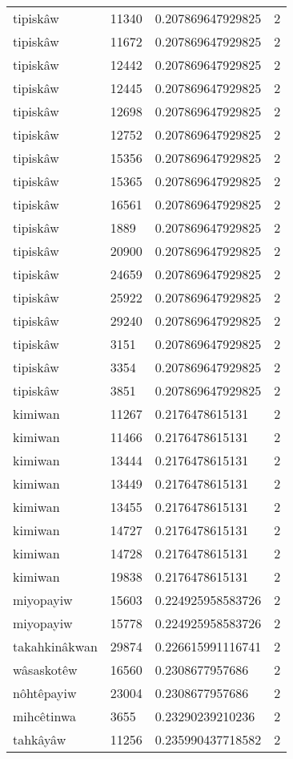 \begin{longtable}{llll}
tipiskâw & 11340 & 0.207869647929825 & 2 \\
tipiskâw & 11672 & 0.207869647929825 & 2 \\
tipiskâw & 12442 & 0.207869647929825 & 2 \\
tipiskâw & 12445 & 0.207869647929825 & 2 \\
tipiskâw & 12698 & 0.207869647929825 & 2 \\
tipiskâw & 12752 & 0.207869647929825 & 2 \\
tipiskâw & 15356 & 0.207869647929825 & 2 \\
tipiskâw & 15365 & 0.207869647929825 & 2 \\
tipiskâw & 16561 & 0.207869647929825 & 2 \\
tipiskâw & 1889 & 0.207869647929825 & 2 \\
tipiskâw & 20900 & 0.207869647929825 & 2 \\
tipiskâw & 24659 & 0.207869647929825 & 2 \\
tipiskâw & 25922 & 0.207869647929825 & 2 \\
tipiskâw & 29240 & 0.207869647929825 & 2 \\
tipiskâw & 3151 & 0.207869647929825 & 2 \\
tipiskâw & 3354 & 0.207869647929825 & 2 \\
tipiskâw & 3851 & 0.207869647929825 & 2 \\
kimiwan & 11267 & 0.2176478615131 & 2 \\
kimiwan & 11466 & 0.2176478615131 & 2 \\
kimiwan & 13444 & 0.2176478615131 & 2 \\
kimiwan & 13449 & 0.2176478615131 & 2 \\
kimiwan & 13455 & 0.2176478615131 & 2 \\
kimiwan & 14727 & 0.2176478615131 & 2 \\
kimiwan & 14728 & 0.2176478615131 & 2 \\
kimiwan & 19838 & 0.2176478615131 & 2 \\
miyopayiw & 15603 & 0.224925958583726 & 2 \\
miyopayiw & 15778 & 0.224925958583726 & 2 \\
takahkinâkwan & 29874 & 0.226615991116741 & 2 \\
wâsaskotêw & 16560 & 0.2308677957686 & 2 \\
nôhtêpayiw & 23004 & 0.2308677957686 & 2 \\
mihcêtinwa & 3655 & 0.23290239210236 & 2 \\
tahkâyâw & 11256 & 0.235990437718582 & 2 \\

\end{longtable}
